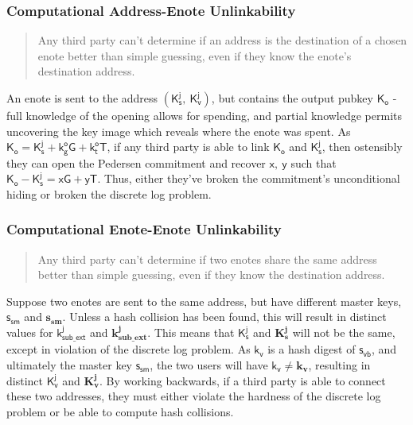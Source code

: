 \documentclass{article}
\theoremstyle{definition}
\newcommand{\6}{\mathbf}
\newcommand{\7}{\mathcal}
\renewcommand{\sf}[1]{{\mathsf{#1}}}
\newcommand{\sfb}[1]{{\mathsf{\mathbf{#1}}}}
\begin{document}
\subsubsection{Computational Address-Enote Unlinkability} 

\begin{quote}
        Any third party can't determine if an address is the destination of a chosen enote better than simple guessing, even if they know the enote's destination address.
\end{quote}

An enote is sent to the address $(\sf{K_s^j}, \ \sf{K_v^j})$, but contains the output pubkey $\sf{K_o}$ - full knowledge of the opening allows for spending, and partial knowledge permits uncovering the key image which reveals where the enote was spent. 
As $\sf{K_o} = \sf{K_s^j} + \sf{k_g^{o}} \sf{G} + \sf{k_t^{o}} \sf{T}$, if any third party is able to link $\sf{K_o}$ and $\sf{K_s^j}$, then ostensibly they can open the Pedersen commitment and recover $\sf{x, \ y}$ such that  $\sf{K_o} - \sf{K_s^j} = \sf{xG} + \sf{yT}$. Thus, either they've broken the commitment's unconditional hiding or broken the discrete log problem.





\subsubsection{Computational Enote-Enote Unlinkability} 

\begin{quote}
        Any third party can't determine if two enotes share the same address better than simple guessing, even if they know the destination address.
\end{quote}


Suppose two enotes are sent to the same address, but have different master keys, $\sf{s_{sm}}$ and $\sfb{s_{sm}}$. Unless a hash collision has been found, this will result in distinct values for $\sf{k_{sub\_ext}^j}$ and $\sfb{k_{sub\_ext}^j}$. This means that $\sf{K_s^j}$ and $\sfb{K_s^j}$ will not be the same, except in violation of the discrete log problem. As $\sf{k_v}$ is a hash digest of $\sf{s_{vb}}$, and ultimately the master key $\sf{s_{sm}}$, the two users will have $\sf{k_v} \neq \sfb{k_v}$, resulting in distinct $\sf{K_v^j}$ and $\sfb{K_v^j}$. By working backwards, if a third party is able to connect these two addresses, they must either violate the hardness of the discrete log problem or be able to compute hash collisions.
\end{document}
